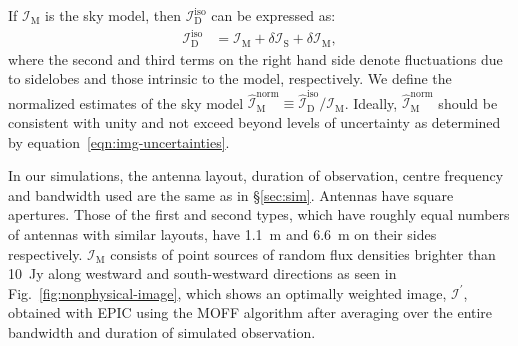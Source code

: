 \documentclass[a4paper,fleqn,usenatbib]{mnras}
\begin{document}
If $\mathcal{I}_\textrm{M}$ is the sky model, then $\mathcal{I}_\textrm{D}^\textrm{iso}$ can be expressed as:
\begin{align}\label{eqn:img-uncertainties}
  \mathcal{I}_\textrm{D}^\textrm{iso} &= \mathcal{I}_\textrm{M} + \delta\mathcal{I}_\textrm{S} + \delta\mathcal{I}_\textrm{M},
\end{align}
where the second and third terms on the right hand side denote fluctuations due to sidelobes and those intrinsic to the model, respectively. We define the normalized estimates of the sky model $\widehat{\mathcal{I}}_\textrm{M}^\textrm{norm} \equiv \widehat{\mathcal{I}}_\textrm{D}^\textrm{iso} / \mathcal{I}_\textrm{M}$. Ideally, $\widehat{\mathcal{I}}_\textrm{M}^\textrm{norm}$ should be consistent with unity and not exceed beyond levels of uncertainty as determined by equation~\ref{eqn:img-uncertainties}.

In our simulations, the antenna layout, duration of observation, centre frequency and bandwidth used are the same as in \S\ref{sec:sim}. Antennas have square apertures. Those of the first and second types, which have roughly equal numbers of antennas with similar layouts, have 1.1~m and 6.6~m on their sides respectively. $\mathcal{I}_\textrm{M}$ consists of point sources of random flux densities brighter than 10~Jy along westward and south-westward directions as seen in Fig.~\ref{fig:nonphysical-image}, which shows an optimally weighted image, $\mathcal{I}^\prime$, obtained with EPIC using the MOFF algorithm after averaging over the entire bandwidth and duration of simulated observation. 
\end{document}
